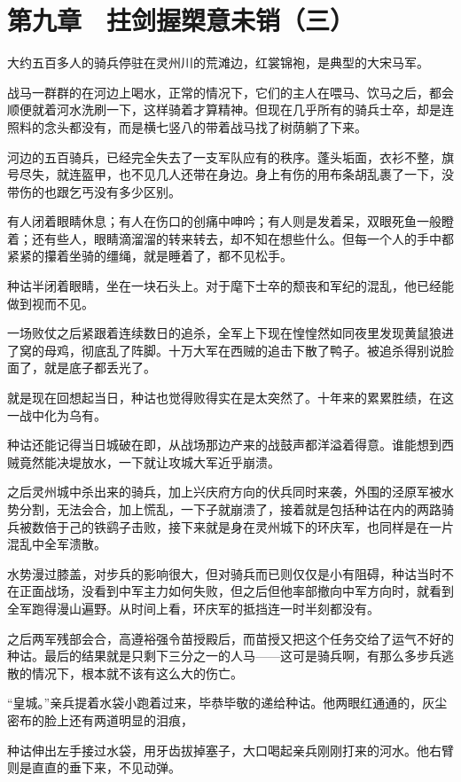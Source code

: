 \section{第九章　拄剑握槊意未销（三）}

大约五百多人的骑兵停驻在灵州川的荒滩边，红裳锦袍，是典型的大宋马军。

战马一群群的在河边上喝水，正常的情况下，它们的主人在喂马、饮马之后，都会顺便就着河水洗刷一下，这样骑着才算精神。但现在几乎所有的骑兵士卒，却是连照料的念头都没有，而是横七竖八的带着战马找了树荫躺了下来。

河边的五百骑兵，已经完全失去了一支军队应有的秩序。蓬头垢面，衣衫不整，旗号尽失，就连盔甲，也不见几人还带在身边。身上有伤的用布条胡乱裹了一下，没带伤的也跟乞丐没有多少区别。

有人闭着眼睛休息；有人在伤口的创痛中呻吟；有人则是发着呆，双眼死鱼一般瞪着；还有些人，眼睛滴溜溜的转来转去，却不知在想些什么。但每一个人的手中都紧紧的攥着坐骑的缰绳，就是睡着了，都不见松手。

种诂半闭着眼睛，坐在一块石头上。对于麾下士卒的颓丧和军纪的混乱，他已经能做到视而不见。

一场败仗之后紧跟着连续数日的追杀，全军上下现在惶惶然如同夜里发现黄鼠狼进了窝的母鸡，彻底乱了阵脚。十万大军在西贼的追击下散了鸭子。被追杀得别说脸面了，就是底子都丢光了。

就是现在回想起当日，种诂也觉得败得实在是太突然了。十年来的累累胜绩，在这一战中化为乌有。

种诂还能记得当日城破在即，从战场那边产来的战鼓声都洋溢着得意。谁能想到西贼竟然能决堤放水，一下就让攻城大军近乎崩溃。

之后灵州城中杀出来的骑兵，加上兴庆府方向的伏兵同时来袭，外围的泾原军被水势分割，无法会合，加上慌乱，一下子就崩溃了，接着就是包括种诂在内的两路骑兵被数倍于己的铁鹞子击败，接下来就是身在灵州城下的环庆军，也同样是在一片混乱中全军溃散。

水势漫过膝盖，对步兵的影响很大，但对骑兵而已则仅仅是小有阻碍，种诂当时不在正面战场，没看到中军主力如何失败，但之后但他率部撤向中军方向时，就看到全军跑得漫山遍野。从时间上看，环庆军的抵挡连一时半刻都没有。

之后两军残部会合，高遵裕强令苗授殿后，而苗授又把这个任务交给了运气不好的种诂。最后的结果就是只剩下三分之一的人马——这可是骑兵啊，有那么多步兵逃散的情况下，根本就不该有这么大的伤亡。

“皇城。”亲兵提着水袋小跑着过来，毕恭毕敬的递给种诂。他两眼红通通的，灰尘密布的脸上还有两道明显的泪痕，

种诂伸出左手接过水袋，用牙齿拔掉塞子，大口喝起亲兵刚刚打来的河水。他右臂则是直直的垂下来，不见动弹。

